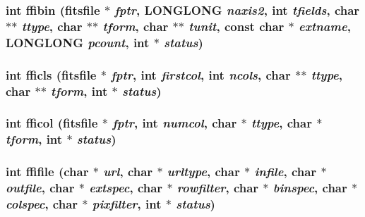 \subsubsection{\setlength{\rightskip}{0pt plus 5cm}int ffibin (\bf{fitsfile} $\ast$ {\em fptr}, \bf{LONGLONG} {\em naxis2}, int {\em tfields}, char $\ast$$\ast$ {\em ttype}, char $\ast$$\ast$ {\em tform}, char $\ast$$\ast$ {\em tunit}, const char $\ast$ {\em extname}, \bf{LONGLONG} {\em pcount}, int $\ast$ {\em status})}\label{test_2roimasker_2fitsio_8h_a58067cf409aa0fa133a4794c43264a3}


\subsubsection{\setlength{\rightskip}{0pt plus 5cm}int fficls (\bf{fitsfile} $\ast$ {\em fptr}, int {\em firstcol}, int {\em ncols}, char $\ast$$\ast$ {\em ttype}, char $\ast$$\ast$ {\em tform}, int $\ast$ {\em status})}\label{test_2roimasker_2fitsio_8h_cd1a0072dd0c525e2263eb781403f1eb}


\subsubsection{\setlength{\rightskip}{0pt plus 5cm}int fficol (\bf{fitsfile} $\ast$ {\em fptr}, int {\em numcol}, char $\ast$ {\em ttype}, char $\ast$ {\em tform}, int $\ast$ {\em status})}\label{test_2roimasker_2fitsio_8h_bbf8d6634ce0e3a4c6446730f4fae58a}


\subsubsection{\setlength{\rightskip}{0pt plus 5cm}int ffifile (char $\ast$ {\em url}, char $\ast$ {\em urltype}, char $\ast$ {\em infile}, char $\ast$ {\em outfile}, char $\ast$ {\em extspec}, char $\ast$ {\em rowfilter}, char $\ast$ {\em binspec}, char $\ast$ {\em colspec}, char $\ast$ {\em pixfilter}, int $\ast$ {\em status})}\label{test_2roimasker_2fitsio_8h_a145a043753a554e3f743ee431fc65d6}



